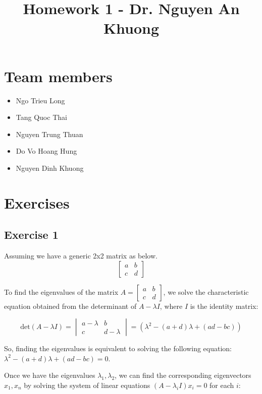 \documentclass{article}
\author{}
\begin{document}
\title{Homework 1 - Dr. Nguyen An Khuong}
\maketitle
\section{Team members}
\begin{itemize}
    \item Ngo Trieu Long
    \item Tang Quoc Thai
    \item Nguyen Trung Thuan
    \item Do Vo Hoang Hung
    \item Nguyen Dinh Khuong
\end{itemize}

\section{Exercises}
\subsection{Exercise 1}
Assuming we have a generic 2x2 matrix as below.
\[
    \begin{bmatrix}
        a & b \\
        c & d
    \end{bmatrix}
\]

To find the eigenvalues of the matrix \( A = \begin{bmatrix} a & b \\ c & d \end{bmatrix} \), we solve the characteristic equation obtained from the determinant of \( A - \lambda I \), where \( I \) is the identity matrix:

\[
    \text{det}(A - \lambda I) = \begin{vmatrix} a - \lambda & b \\ c & d - \lambda \end{vmatrix} = (\lambda^2 - (a+d)\lambda + (ad-bc))
\]

So, finding the eigenvalues is equivalent to solving the following equation: \( \lambda^2 - (a+d)\lambda + (ad-bc) = 0 \).

Once we have the eigenvalues \( \lambda_1, \lambda_2 \), we can find the corresponding eigenvectors \( x_1, x_n \) by solving the system of linear equations \( (A - \lambda_i I)x_i = 0 \) for each \( i \):
\end{document}
